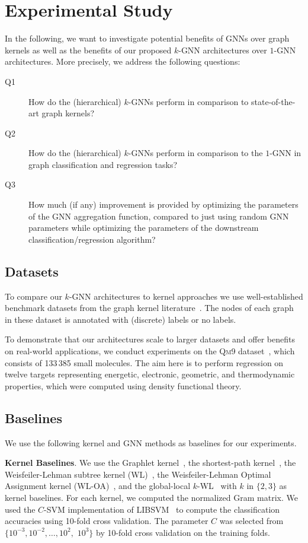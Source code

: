 \documentclass[letterpaper]{article}
\theoremstyle{definition}
\newcommand{\xhdr}[1]{{\noindent\bfseries #1}.}
\begin{document}
\section{Experimental Study}

In the following, we want to investigate potential benefits of GNNs over graph kernels as well as the benefits of our proposed $k$-GNN architectures over $1$-GNN architectures. More precisely, we address the following questions:
\begin{description}
	\item[Q1] How do the (hierarchical) $k$-GNNs perform in comparison to state-of-the-art graph kernels? 
	\item[Q2] How do the (hierarchical)  $k$-GNNs perform in comparison to the $1$-GNN in graph classification and regression tasks?
	\item[Q3]
	How much (if any) improvement is provided by optimizing the parameters of the GNN aggregation function, compared to just using random GNN parameters while optimizing the parameters of the downstream classification/regression algorithm?
\end{description}

\subsection{Datasets }
To compare our $k$-GNN architectures to kernel approaches we use well-established benchmark datasets from the graph kernel literature~\cite{KKMMN2016}. The nodes of each graph in these dataset is annotated with (discrete) labels or no labels. %

To demonstrate that our architectures scale to larger datasets and offer benefits on real-world applications, we conduct experiments on the \textsc{Qm9} dataset~\cite{Ram+2014,Rud+2012,Wu+2018}, which consists of 133\,385 small molecules. The aim here is to perform regression on twelve targets representing energetic, electronic, geometric, and thermodynamic properties, which were computed using density functional theory.


\subsection{Baselines}

We use the following kernel and GNN methods as baselines for our experiments.

\xhdr{Kernel Baselines} We use the Graphlet kernel~\cite{She+2009}, the shortest-path kernel~\cite{Borgwardt2005}, the Weisfeiler-Lehman subtree kernel (\textsc{WL})~\cite{She+2011}, the Weisfeiler-Lehman Optimal Assignment kernel (\textsc{WL-OA})~\cite{Kri+2016}, and the global-local $k$-WL~\cite{Mor+2017} with $k$ in $\{2,3\}$ as kernel baselines. 
For each kernel, we computed the normalized Gram matrix. 
We used the $C$-SVM implementation of LIBSVM~\cite{Cha+2011} to compute the classification accuracies using 10-fold cross validation. 
The parameter $C$ was selected from $\{10^{-3}, 10^{-2}, \dotsc, 10^{2},$ $10^{3}\}$ by 10-fold cross validation on the training folds. 
\end{document}
